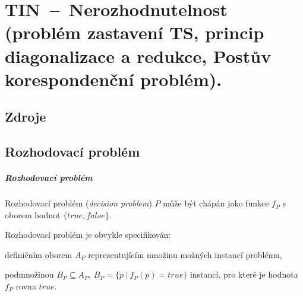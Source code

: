 

\graphicspath{{tin/nerozhodnutelnost/figures}}


\chapter{TIN~--~Nerozhodnutelnost (problém zastavení TS, princip diagonalizace a redukce, Postův korespondenční problém).}


\section{Zdroje}

\begin{compactitem}
    \item {}
    \item {}
    \item {}
\end{compactitem}


\section{Rozhodovací problém}

\paragraph*{Rozhodovací problém}

\begin{compactitem}
    \item Rozhodovací problém (\textit{decision problem}) $P$ může být chápán jako funkce $f_P$ s oborem hodnot $\{ true, false \}$.

    \item Rozhodovací problém je obvykle specifikován: \begin{compactitem}
        \item definičním oborem $A_P$ reprezentujícím množinu možných instancí problému,

        \item podmnožinou $B_P \subseteq A_P$, $B_P = \{ p ~|~ f_P(p) = true \}$ instancí, pro které je hodnota $f_P$ rovna $true$.
    \end{compactitem}
\end{compactitem}

